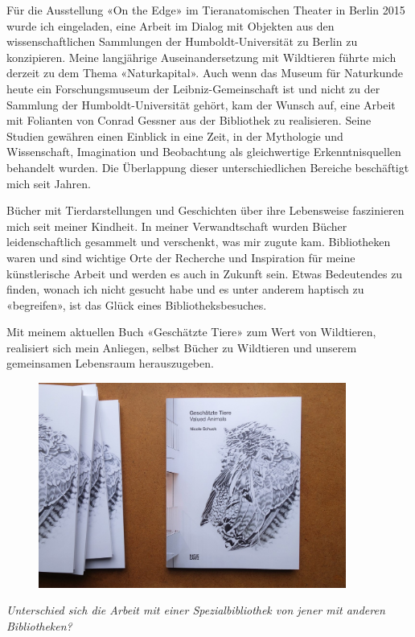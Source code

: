 \documentclass[a4paper,
fontsize=11pt,
oneside,
numbers=noperiodatend,
parskip=half-,
bibliography=totoc,
final
]{scrartcl}
\begin{document}
Für die Ausstellung «On the Edge» im Tieranatomischen Theater in Berlin
2015 wurde ich eingeladen, eine Arbeit im Dialog mit Objekten aus den
wissenschaftlichen Sammlungen der Humboldt-Universität zu Berlin zu
konzipieren. Meine langjährige Auseinandersetzung mit Wildtieren führte
mich derzeit zu dem Thema «Naturkapital». Auch wenn das Museum für
Naturkunde heute ein Forschungsmuseum der Leibniz-Gemeinschaft ist und
nicht zu der Sammlung der Humboldt-Universität gehört, kam der Wunsch
auf, eine Arbeit mit Folianten von Conrad Gessner aus der Bibliothek zu
realisieren. Seine Studien gewähren einen Einblick in eine Zeit, in der
Mythologie und Wissenschaft, Imagination und Beobachtung als
gleichwertige Erkenntnisquellen behandelt wurden. Die Überlappung dieser
unterschiedlichen Bereiche beschäftigt mich seit Jahren.

Bücher mit Tierdarstellungen und Geschichten über ihre Lebensweise
faszinieren mich seit meiner Kindheit. In meiner Verwandtschaft wurden
Bücher leidenschaftlich gesammelt und verschenkt, was mir zugute kam.
Bibliotheken waren und sind wichtige Orte der Recherche und Inspiration
für meine künstlerische Arbeit und werden es auch in Zukunft sein. Etwas
Bedeutendes zu finden, wonach ich nicht gesucht habe und es unter
anderem haptisch zu «begreifen», ist das Glück eines
Bibliotheksbesuches.

Mit meinem aktuellen Buch «Geschätzte Tiere» zum Wert von Wildtieren,
realisiert sich mein Anliegen, selbst Bücher zu Wildtieren und unserem
gemeinsamen Lebensraum herauszugeben.

\begin{figure}
\centering
\includegraphics[width=0.9\textwidth]{img/image1.jpg}
\end{figure}

\emph{Unterschied sich die Arbeit mit einer Spezialbibliothek von jener
mit anderen Bibliotheken?}
\end{document}

